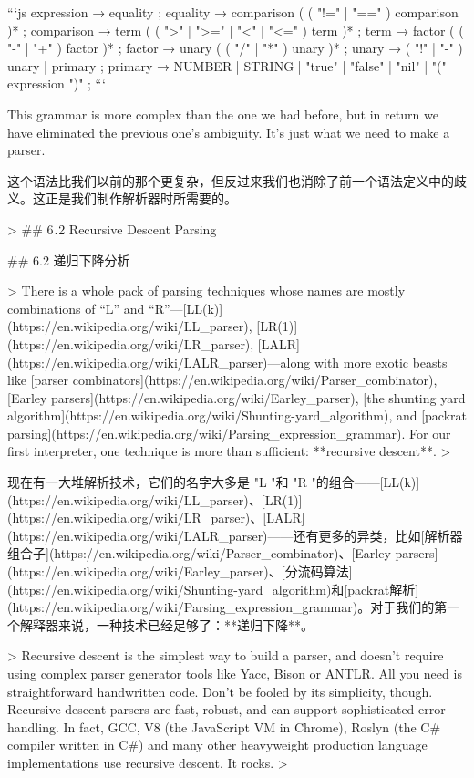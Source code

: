 \documentclass[cn,11pt,chinese]{elegantbook}
\begin{document}
```js
expression     → equality ;
equality       → comparison ( ( "!=" | "==" ) comparison )* ;
comparison     → term ( ( ">" | ">=" | "<" | "<=" ) term )* ;
term           → factor ( ( "-" | "+" ) factor )* ;
factor         → unary ( ( "/" | "*" ) unary )* ;
unary          → ( "!" | "-" ) unary
               | primary ;
primary        → NUMBER | STRING | "true" | "false" | "nil"
               | "(" expression ")" ;
```

This grammar is more complex than the one we had before, but in return we have eliminated the previous one’s ambiguity. It’s just what we need to make a parser.

这个语法比我们以前的那个更复杂，但反过来我们也消除了前一个语法定义中的歧义。这正是我们制作解析器时所需要的。

> ## 6 . 2 Recursive Descent Parsing

## 6.2 递归下降分析

> There is a whole pack of parsing techniques whose names are mostly combinations of “L” and “R”—[LL(k)](https://en.wikipedia.org/wiki/LL_parser), [LR(1)](https://en.wikipedia.org/wiki/LR_parser), [LALR](https://en.wikipedia.org/wiki/LALR_parser)—along with more exotic beasts like [parser combinators](https://en.wikipedia.org/wiki/Parser_combinator), [Earley parsers](https://en.wikipedia.org/wiki/Earley_parser), [the shunting yard algorithm](https://en.wikipedia.org/wiki/Shunting-yard_algorithm), and [packrat parsing](https://en.wikipedia.org/wiki/Parsing_expression_grammar). For our first interpreter, one technique is more than sufficient: **recursive descent**.
>

现在有一大堆解析技术，它们的名字大多是 "L "和 "R "的组合——[LL(k)](https://en.wikipedia.org/wiki/LL_parser)、[LR(1)](https://en.wikipedia.org/wiki/LR_parser)、[LALR](https://en.wikipedia.org/wiki/LALR_parser)——还有更多的异类，比如[解析器组合子](https://en.wikipedia.org/wiki/Parser_combinator)、[Earley parsers](https://en.wikipedia.org/wiki/Earley_parser)、[分流码算法](https://en.wikipedia.org/wiki/Shunting-yard_algorithm)和[packrat解析](https://en.wikipedia.org/wiki/Parsing_expression_grammar)。对于我们的第一个解释器来说，一种技术已经足够了：**递归下降**。

> Recursive descent is the simplest way to build a parser, and doesn’t require using complex parser generator tools like Yacc, Bison or ANTLR. All you need is straightforward handwritten code. Don’t be fooled by its simplicity, though. Recursive descent parsers are fast, robust, and can support sophisticated error handling. In fact, GCC, V8 (the JavaScript VM in Chrome), Roslyn (the C# compiler written in C#) and many other heavyweight production language implementations use recursive descent. It rocks.
>
\end{document}
